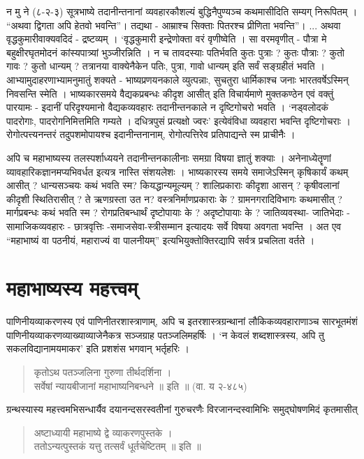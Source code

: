 न मु ने (८-२-३) सूत्रभाष्ये तदानीन्तनानां व्यवहारकौशल्यं बुद्धिनैपुण्यञ्च कथमासीदिति सम्यग् निरूपितम् । “अथवा द्विगता अपि हेतवो भवन्ति”। तद्यथा - आम्राश्च सिक्ताः पितरश्च प्रीणिता भवन्ति”। ... अथवा वृद्धकुमारीवाक्यवदिदं - द्रष्टव्यम् । ‘वृद्धकुमारी इन्द्रेणोक्ता वरं वृणीष्वेति । सा वरमवृणीत् - पौत्रा मे बहुक्षीरघृतमोदनं कांस्यपात्र्यां भुञ्जीरन्निति । न च तावदस्याः पतिर्भवति कुतः पुत्राः ? कुतः पौत्राः ? कुतो गावः ? कुतो धान्यम् ?  तत्रानया वाक्येनैकेन पतिः, पुत्रा, गावो धान्यम् इति सर्वं सङ्ग्रहीतं भवति । आभ्यामुदाहरणाभ्यामनुमातुं शक्यते - भाष्यप्रणयनकाले व्युत्पन्नाः, सुचतुरा धार्मिकाश्च जनाः भारतवर्षेऽस्मिन् निवसन्ति स्मेति । भाष्यकारसमये वैद्यकप्रबन्धः कीदृश आसीत् इति विचार्यमाणे मुक्तकण्ठेन एवं वक्तुं पारयामः - इदानीं परिदृश्यमानो वैद्यकव्यवहारः तदानीन्तनकाले न दृष्टिगोचरो भवति । ‘नड्वलोदकं पादरोगाः, पादरोगनिमित्तमिति गम्यते । दधित्रपुसं प्रत्यक्षो ज्वरः’ इत्येवंविधा व्यवहारा भवन्ति दृष्टिगोचराः । रोगोत्पत्त्यनन्तरं तदुपशमोपायश्च इदानीन्तनानाम्, रोगोत्पत्तिरेव प्रतिपाद्यन्ते स्म प्राचीनैः ।

अपि च महाभाष्यस्य तलस्पर्शाध्ययने तदानीन्तनकालीनाः समग्रा विषया ज्ञातुं शक्याः । अनेनाध्येतॄणां व्यावहारिकज्ञानमप्यभिवर्धत इत्यत्र नास्ति संशयलेशः । भाष्यकारस्य समये समाजेऽस्मिन् कृषिकार्यं कथम् आसीत् ? धान्यसञ्चयः कथं भवति स्म? कियद्धान्यमूल्यम् ? शालिप्रकाराः कीदृशा आसन् ? कृषीवलानां कीदृशी स्थितिरासीत् ? ते ऋणग्रस्ता उत न? वस्त्रनिर्माणप्रकाराः के ? ग्रामनगरादिविभागः कथमासीत् ? मार्गप्रबन्धः कथं भवति स्म ? रोगप्रतिबन्धार्थं दृष्टोपायाः के ? अदृष्टोपायाः के ? जातिव्यवस्था- जातिभेदाः - सामाजिकव्यवहारः - छात्रवृत्तिः -समाजसेवा-स्त्रीसम्मान इत्यादयः सर्वे विषया अवगता भवन्ति । अत एव “महाभाष्यं वा पठनीयं, महाराज्यं वा पालनीयम्” इत्यभियुक्तोक्तिरद्यापि सर्वत्र प्रचलिता वर्तते ।

\section*{महाभाष्यस्य महत्त्वम्}

पाणिनीयव्याकरणस्य एवं पाणिनीतरशास्त्राणाम्, अपि च इतरशास्त्रग्रन्थानां लौकिकव्यवहाराणाञ्च सारभूतमंशं पाणिनीयव्याकरणव्याख्याव्याजेनैकत्र सञ्जग्राह पतञ्जलिमहर्षिः । ‘न केवलं शब्दशास्त्रस्य, अपि तु सकलविद्यानामयमाकर’ इति प्रशशंस भगवान् भर्तृहरिः ।
\begin{verse}
कृतोऽथ पतञ्जलिना गुरुणा तीर्थदर्शिना ।\\
सर्वेषां न्यायबीजानां महाभाष्यनिबन्धने ॥ इति ॥ (वा. य २-४८५)
\end{verse}
ग्रन्थस्यास्य महत्त्वमभिसन्धार्यैव दयानन्दसरस्वतीनां गुरुचरणैः विरजानन्दस्वामिभिः समुद्घोषणमिदं कृतमासीत् 
\begin{verse}
अष्टाध्यायी महाभाष्ये द्वे व्याकरणपुस्तके ।\\
ततोऽन्यत्पुस्तकं यत्तु तत्सर्वं धूर्तचेष्टितम् ॥ इति ॥
\end{verse}

